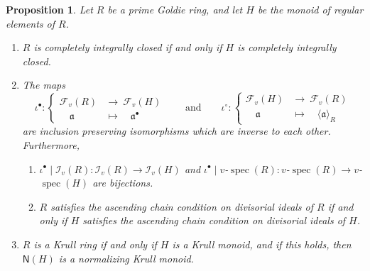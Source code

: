 \documentclass[a4paper]{amsart}
\newtheorem{proposition}[theorem]{Proposition}
\theoremstyle{definition}
\numberwithin{equation}{section}
\begin{document}
\medskip
\begin{proposition} \label{5.1}
Let $R$ be a prime Goldie ring, and let $H$ be the monoid of regular
elements of $R$.
\begin{enumerate}
\item $R$ is completely integrally closed if and only if $H$ is
completely integrally closed.

\smallskip
\item The maps
      \[
      \iota^\bullet \colon
      \begin{cases}
      \mathcal F_v(R) &\to \  \mathcal F_v(H)\\
      \quad \mathfrak a &\mapsto \quad \mathfrak a^{\bullet}
      \end{cases}
      \qquad \text{and} \qquad \iota^\circ \colon
      \begin{cases}
      \mathcal F_v(H) &\to \  \mathcal F_v(R)\\
      \quad \mathfrak a &\mapsto \quad \langle \mathfrak a \rangle_R
      \end{cases}
      \]
      are inclusion preserving  isomorphisms which are inverse to each
      other. Furthermore,
      \begin{enumerate}
      \smallskip
      \item $\iota^{\bullet} \mid \mathcal I_v (R)  \colon \mathcal I_v (R)  \to \mathcal I_v (H)$ and
            $\iota^{\bullet} \mid v$-$\operatorname{spec} (R) \colon v$-$\operatorname{spec} (R) \to v$-$\operatorname{spec}
            (H)$ are bijections.

      \smallskip
      \item $R$ satisfies the ascending chain condition on  divisorial ideals of $R$ if
            and only if $H$ satisfies the ascending
            chain condition on divisorial ideals of $H$.
      \end{enumerate}

\smallskip
\item  $R$ is a Krull ring if and only if $H$ is a Krull monoid, and
      if this holds, then $\mathsf N (H)$ is a
      normalizing Krull monoid.
\end{enumerate}
\end{proposition}
\end{document}
